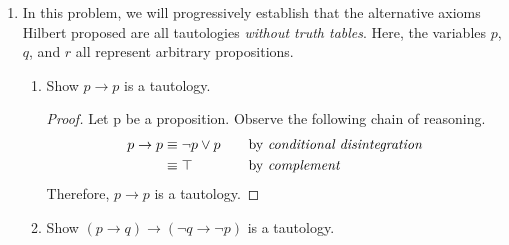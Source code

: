 \documentclass{article}
\begin{document}
\begin {enumerate}
\begin{enumerate}
\begin{proof}
\begin{align*}
              \\
            &\equiv \top
              &\quad
              &\text{by \emph{complement}}
              \\
        \end{align*}
        Therefore, $(p \rightarrow q) \rightarrow ((p \rightarrow \neg q) \rightarrow \neg p)$ is a tautology.
        \end{proof}
    \end{enumerate}
\pagebreak
    \item In this problem, we will progressively establish that the alternative axioms Hilbert proposed are all tautologies \emph{without truth tables}.
    Here, the variables $p$, $q$, and $r$ all represent arbitrary propositions.
    \begin{enumerate}
      \item
        Show $p \rightarrow p$ is a tautology.

        \vspace{2ex}
        \begin{proof}
        Let p be a proposition. Observe the following chain of reasoning.
        \begin{align*}
          p \rightarrow p
           &\equiv \neg p \lor p
            &\quad
            &\text{by \emph{conditional disintegration}}
            \\
           &\equiv \top
            &\quad
            &\text{by \emph{complement}}
            \\
        \end{align*}
        Therefore, $p \rightarrow p$ is a tautology.
        \end{proof}

\hrulefill

      \item
        Show $(p \rightarrow q) \rightarrow (\neg q \rightarrow \neg p)$ is a tautology.


\end{enumerate}
\end{enumerate}
\end{document}
